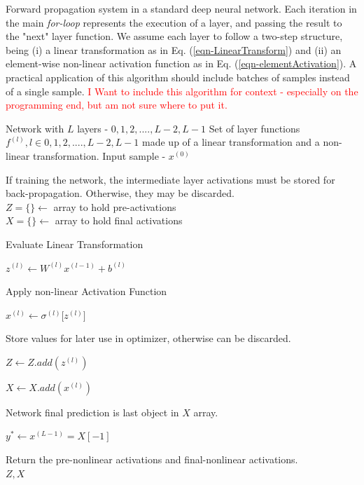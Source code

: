 \documentclass[12pt,letterpaper]{article}
\begin{document}
\begin{algorithm}[H]
\caption{Forward propagation system in a standard deep neural network. Each iteration in the main \textit{for-loop} represents the execution of a layer, and passing the result to the "next" layer function. We assume each layer to follow a two-step structure, being (i) a linear transformation as in Eq. (\ref{eqn-LinearTransform}) and (ii) an element-wise non-linear activation function as in Eq. (\ref{eqn-elementActivation}).  A practical application of this algorithm should include batches of samples instead of a single sample.
\textcolor{red}{I Want to include this algorithm for context - especially on the programming end, but am not sure where to put it. }}
\label{algFeedForward}

\begin{algorithmic}
\REQUIRE Network with $L$ layers - $0,1,2,....,L-2,L-1$
\REQUIRE Set of layer functions $f^{(l)}, l \in 0,1,2,....,L-2,L-1$ made up of a linear transformation and a non-linear transformation.
\REQUIRE Input sample - $x^{(0)}$

If training the network, the intermediate layer activations must be stored for back-propagation. Otherwise, they may be discarded. \\
$Z = \{\} \leftarrow$ array to hold pre-activations \\
$X = \{\} \leftarrow$ array to hold final activations \\

	\item Evaluate Linear Transformation
	\item $z^{(l)} \leftarrow W^{(l)} x^{(l-1)} + b^{(l)}$ 
	\item Apply non-linear Activation Function
	\item $x^{(l)} \leftarrow \sigma^{(l)} \big[ z^{(l)} \big]$ 
	\item Store values for later use in optimizer, otherwise can be discarded.
	\item $Z \leftarrow Z.add(z^{(l)})$
	\item $X \leftarrow X.add(x^{(l)})$
\ENDFOR

\item Network final prediction is last object in $X$ array.
\item $y^* \leftarrow x^{(L-1)} = X[-1]$
\item Return the pre-nonlinear activations and final-nonlinear activations.\\
\RETURN $Z , X$


\end{algorithmic}
\end{algorithm}
\end{document}
